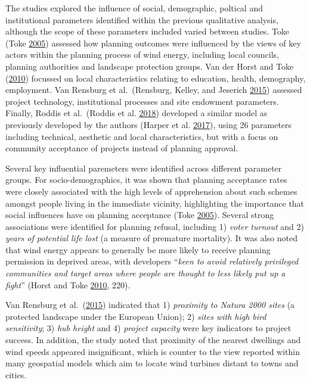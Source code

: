 \documentclass[a4paper,]{article}
\theoremstyle{definition}
\theoremstyle{definition}
\theoremstyle{definition}
\theoremstyle{remark}
\begin{document}
The studies explored the influence of social, demographic, poltical and
institutional parameters identified within the previous qualitative
analysis, although the scope of these parameters included varied between
studies. Toke (Toke \protect\hyperlink{ref-Toke2005}{2005}) assessed how
planning outcomes were influenced by the views of key actors within the
planning process of wind energy, including local councils, planning
authorities and landscape protection groups. Van der Horst and Toke
(\protect\hyperlink{ref-VanderHorst2010}{2010}) focussed on local
characteristics relating to education, health, demography, employment.
Van Rensburg et al.~(Rensburg, Kelley, and Jeserich
\protect\hyperlink{ref-VanRensburg20}{2015}) assessed project
technology, institutional processes and site endowment parameters.
Finally, Roddis et al.~(Roddis et al.
\protect\hyperlink{ref-Roddis2018}{2018}) developed a similar model as
previously developed by the authors (Harper et al.
\protect\hyperlink{ref-Harper2017}{2017}), using 26 parameters including
technical, aesthetic and local characteristics, but with a focus on
community acceptance of projects instead of planning approval.

Several key influential paremeters were identified across different
parameter groups. For socio-demographics, it was shown that planning
acceptance rates were closely associated with the high levels of
apprehension about such schemes amongst people living in the immediate
vicinity, highlighting the importance that social influences have on
planning acceptance (Toke \protect\hyperlink{ref-Toke2005}{2005}).
Several strong associations were identified for planning refusal,
including 1) \emph{voter turnout} and 2) \emph{years of potential life
lost} (a measure of premature mortality). It was also noted that wind
energy appears to generally be more likely to receive planning
permission in deprived areas, with developers ``\emph{keen to avoid
relatively privileged communities and target areas where people are
thought to less likely put up a fight}'' (Horst and Toke
\protect\hyperlink{ref-VanderHorst2010}{2010}, 220).

Van Rensburg et al.~(\protect\hyperlink{ref-VanRensburg20}{2015})
indicated that 1) \emph{proximity to Natura 2000 sites} (a protected
landscape under the European Union); 2) \emph{sites with high bird
sensitivity}; 3) \emph{hub height} and 4) \emph{project capacity} were
key indicators to project success. In addition, the study noted that
proximity of the nearest dwellings and wind speeds appeared
insignificant, which is counter to the view reported within many
geospatial models which aim to locate wind turbines distant to towns and
cities.
\end{document}
